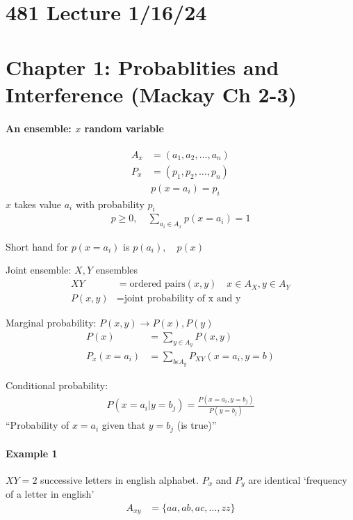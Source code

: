 \documentclass[../main.tex]{subfiles}
\begin{document}
\section*{481 Lecture 1/16/24}
\barh \vspace{10px}
\section{Chapter 1: Probablities and Interference (Mackay Ch 2-3)}
\barh

\paragraph{An ensemble: $x$ random variable}

\begin{align*}
    A_x &= (a_1, a_2, \dots, a_n) \\
    P_x &= (p_1, p_2, \dots, p_n) \\
    &p(x = a_i) = p_i 
\end{align*}
$x$ takes value $a_i$ with probability $p_i$
\begin{align*}
    p \geq 0, \quad \sum_{a_i \in A_x} p(x = a_i) = 1
\end{align*}

Short hand for $p(x = a_i)$ is $p(a_i), \quad p(x)$

Joint ensemble: $X, Y$ ensembles
\begin{align*}
    XY &= \text{ordered pairs} (x, y) \quad x \in A_X, y \in A_Y \\
    P(x,y) &= \text{joint probability of x and y} 
\end{align*}

Marginal probability: $P(x,y) \rightarrow P(x), P(y)$
\begin{align*}
    P(x) &= \sum_{y \in A_y} P(x,y) \\
    P_x(x = a_i) &= \sum_{b \epsilon A_y} P_{XY}(x = a_i, y = b)
\end{align*}

Conditional probability: 
\begin{align*}
    P(x = a_i | y = b_j) = \frac{P(x = a_i, y = b_j)}{P(y = b_j)} 
\end{align*}
``Probability of $x = a_i$ given that $y = b_j$ (is true)''

\paragraph{Example 1}
$XY = 2$ successive letters in english alphabet.
$P_x$ and $P_y$ are identical `frequency of a letter in english'
\begin{align*}
    A_{xy} &= \{aa, ab, ac, \dots, zz\}
\end{align*} 
\end{document}
